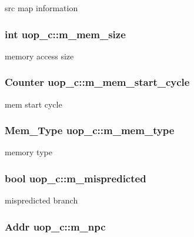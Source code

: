 \label{classuop__c_a2d59c4434f359dc0986e39d70c547024}
src map information \hypertarget{classuop__c_a2b1a6a46c6f697826fdaa258298ad58c}{
\subsubsection[{m\_\-mem\_\-size}]{\setlength{\rightskip}{0pt plus 5cm}int {\bf uop\_\-c::m\_\-mem\_\-size}}}
\label{classuop__c_a2b1a6a46c6f697826fdaa258298ad58c}
memory access size \hypertarget{classuop__c_a7b653e864bbc4569c7b566b1eb944603}{
\subsubsection[{m\_\-mem\_\-start\_\-cycle}]{\setlength{\rightskip}{0pt plus 5cm}Counter {\bf uop\_\-c::m\_\-mem\_\-start\_\-cycle}}}
\label{classuop__c_a7b653e864bbc4569c7b566b1eb944603}
mem start cycle \hypertarget{classuop__c_a367c4313b99264de545c594bd0c60662}{
\subsubsection[{m\_\-mem\_\-type}]{\setlength{\rightskip}{0pt plus 5cm}Mem\_\-Type {\bf uop\_\-c::m\_\-mem\_\-type}}}
\label{classuop__c_a367c4313b99264de545c594bd0c60662}
memory type \hypertarget{classuop__c_afa08f6646fb5b5ce6110057e81c72a13}{
\subsubsection[{m\_\-mispredicted}]{\setlength{\rightskip}{0pt plus 5cm}bool {\bf uop\_\-c::m\_\-mispredicted}}}
\label{classuop__c_afa08f6646fb5b5ce6110057e81c72a13}
mispredicted branch \hypertarget{classuop__c_a4aad3ee2a1aa0286421bc198866765b9}{
\subsubsection[{m\_\-npc}]{\setlength{\rightskip}{0pt plus 5cm}Addr {\bf uop\_\-c::m\_\-npc}}}
